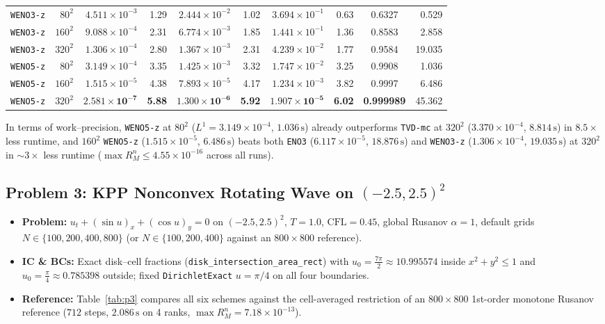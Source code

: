 \documentclass[11pt,a4paper]{article}
\theoremstyle{definition}
\newcommand{\code}[1]{\texttt{#1}}
\begin{document}
\begin{table}[h]
\begin{tabular}{@{}lrrrrrrrcr@{}}
\midrule
\code{WENO3-z}   & $80^2$  & $4.511\times 10^{-3}$ & 1.29 & $2.444\times 10^{-2}$ & 1.02 & $3.694\times 10^{-1}$ & 0.63 & 0.6327 & 0.529 \\
\code{WENO3-z}   & $160^2$ & $9.088\times 10^{-4}$ & 2.31 & $6.774\times 10^{-3}$ & 1.85 & $1.441\times 10^{-1}$ & 1.36 & 0.8583 & 2.858 \\
\code{WENO3-z}   & $320^2$ & $1.306\times 10^{-4}$ & 2.80 & $1.367\times 10^{-3}$ & 2.31 & $4.239\times 10^{-2}$ & 1.77 & 0.9584 & 19.035 \\
\midrule
\code{WENO5-z}   & $80^2$  & $3.149\times 10^{-4}$ & 3.35 & $1.425\times 10^{-3}$ & 3.32 & $1.747\times 10^{-2}$ & 3.25 & 0.9908 & 1.036 \\
\code{WENO5-z}   & $160^2$ & $1.515\times 10^{-5}$ & 4.38 & $7.893\times 10^{-5}$ & 4.17 & $1.234\times 10^{-3}$ & 3.82 & 0.9997 & 6.486 \\
\code{WENO5-z}   & $320^2$ & $\mathbf{2.581\times 10^{-7}}$ & \textbf{5.88} & $\mathbf{1.300\times 10^{-6}}$ & \textbf{5.92} & $\mathbf{1.907\times 10^{-5}}$ & \textbf{6.02} & \textbf{0.999989} & 45.362 \\
\bottomrule
\end{tabular}
\end{table}

In terms of work--precision, \code{WENO5-z} at $80^2$ ($L^1 = 3.149\times 10^{-4}$, $1.036\,\text{s}$) already outperforms \code{TVD-mc} at $320^2$ ($3.370\times 10^{-4}$, $8.814\,\text{s}$) in $8.5\times$ less runtime, and $160^2$ \code{WENO5-z} ($1.515\times 10^{-5}$, $6.486\,\text{s}$) beats both \code{ENO3} ($6.117\times 10^{-5}$, $18.876\,\text{s}$) and \code{WENO3-z} ($1.306\times 10^{-4}$, $19.035\,\text{s}$) at $320^2$ in $\sim 3\times$ less runtime ($\max R_M^n \le 4.55\times 10^{-16}$ across all runs).

\subsection{Problem 3: KPP Nonconvex Rotating Wave on $(-2.5,2.5)^2$}

\begin{itemize}
\item \textbf{Problem:} $u_t + (\sin u)_x + (\cos u)_y = 0$ on $(-2.5,2.5)^2$, $T=1.0$, $\mathrm{CFL}=0.45$, global Rusanov $\alpha=1$, default grids $N\in\{100,200,400,800\}$ (or $N\in\{100,200,400\}$ against an $800\times 800$ reference).
\item \textbf{IC \& BCs:} Exact disk--cell fractions (\code{disk\_intersection\_area\_rect}) with $u_0 = \frac{7\pi}{2}\approx 10.995574$ inside $x^2+y^2 \le 1$ and $u_0 = \frac{\pi}{4}\approx 0.785398$ outside; fixed \code{DirichletExact} $u = \pi/4$ on all four boundaries.
\item \textbf{Reference:} Table~\ref{tab:p3} compares all six schemes against the cell-averaged restriction of an $800\times 800$ 1st-order monotone Rusanov reference ($712$ steps, $2.086\,\text{s}$ on 4 ranks, $\max R_M^n = 7.18\times 10^{-13}$).
\end{itemize}
\end{document}
